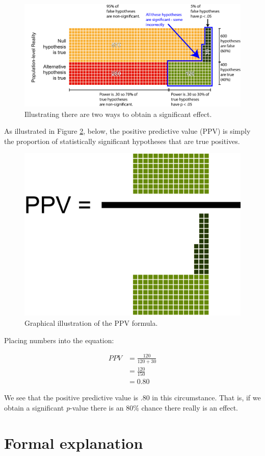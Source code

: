 \documentclass[
]{krantz}
\begin{document}
\begin{figure}
\includegraphics[width=0.9\linewidth]{ch_ppv/images/fig4} \caption{Illustrating there are two ways to obtain a significant effect.}\label{fig:ppvfig4}
\end{figure}

As illustrated in Figure \ref{fig:ppvfig5}, below, the positive predictive value (PPV) is simply the proportion of statistically significant hypotheses that are true positives.

\begin{figure}

{\centering \includegraphics[width=0.4\linewidth]{ch_ppv/images/fig5} 

}

\caption{Graphical illustration of the PPV formula.}\label{fig:ppvfig5}
\end{figure}

Placing numbers into the equation:

\[
\begin{aligned}
PPV &= \frac{120 }{120  + 30} \\
&= \frac{120}{150} \\
&= 0.80
\end{aligned}
\]

We see that the positive predictive value is .80 in this circumstance. That is, if we obtain a significant \emph{p}-value there is an 80\% chance there really is an effect.

\hypertarget{formal-explanation}{%
\section{Formal explanation}\label{formal-explanation}}
\end{document}
